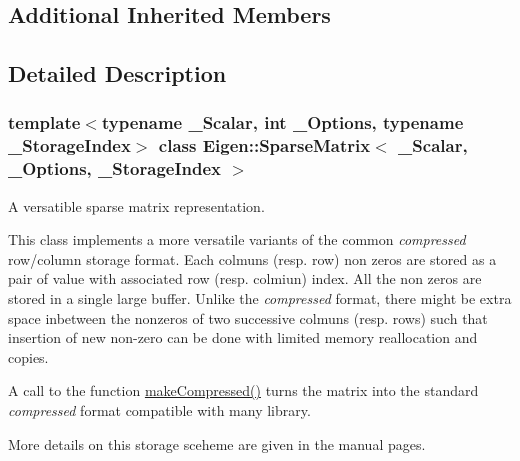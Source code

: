 \subsection*{Additional Inherited Members}


\subsection{Detailed Description}
\subsubsection*{template$<$typename \+\_\+\+Scalar, int \+\_\+\+Options, typename \+\_\+\+Storage\+Index$>$\newline
class Eigen\+::\+Sparse\+Matrix$<$ \+\_\+\+Scalar, \+\_\+\+Options, \+\_\+\+Storage\+Index $>$}

A versatible sparse matrix representation. 

This class implements a more versatile variants of the common {\itshape compressed} row/column storage format. Each colmun\textquotesingle{}s (resp. row) non zeros are stored as a pair of value with associated row (resp. colmiun) index. All the non zeros are stored in a single large buffer. Unlike the {\itshape compressed} format, there might be extra space inbetween the nonzeros of two successive colmuns (resp. rows) such that insertion of new non-\/zero can be done with limited memory reallocation and copies.

A call to the function \mbox{\hyperlink{class_eigen_1_1_sparse_matrix_a5ff54ffc10296f9466dc81fa888733fd}{make\+Compressed()}} turns the matrix into the standard {\itshape compressed} format compatible with many library.

More details on this storage sceheme are given in the manual pages.


